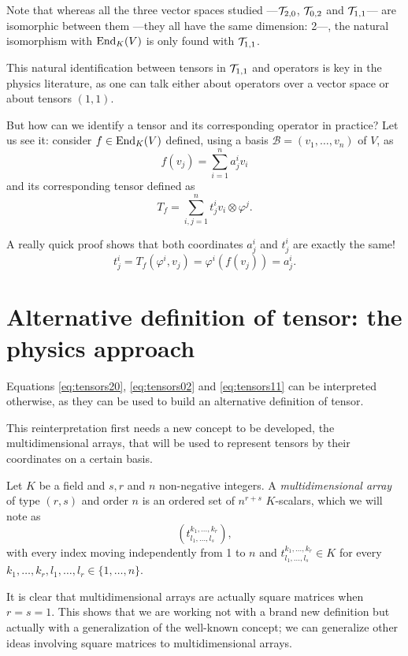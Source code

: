 Note that whereas all the three vector spaces studied ---${\mathcal T}_{2,0}$, ${\mathcal T}_{0,2}$ and ${\mathcal T}_{1,1}$--- are isomorphic between them ---they all have the same dimension: 2---, the natural isomorphism with $\operatorname{End}_K(V)$ is only found with ${\mathcal T}_{1,1}$.

\begin{remark}
	This natural identification between tensors in ${\mathcal T}_{1,1}$ and operators is key in the physics literature, as one can talk either about operators over a vector space or about tensors $(1,1)$.

	But how can we identify a tensor and its corresponding operator in practice? Let us see it: consider $f \in \operatorname{End}_K(V)$ defined, using a basis $\mathcal{B} = (v_1, \dots, v_n)$ of $V$, as
	\[
		f(v_j) = \sum_{i=1}^n a^i_j v_i
	\]
	and its corresponding tensor defined as
	\[
		T_f = \sum_{i,j=1}^n t^i_j v_i \otimes \varphi^j.
	\]

	A really quick proof shows that both coordinates $a^i_j$ and $t^i_j$ are exactly the same!
	\[
		t^i_j = T_f(\varphi^i, v_j) = \varphi^i(f(v_j)) = a^i_j.
	\]
\end{remark}

\section{Alternative definition of tensor: the physics approach}

Equations \ref{eq:tensors20}, \ref{eq:tensors02} and \ref{eq:tensors11} can be interpreted otherwise, as they can be used to build an alternative definition of tensor.

This reinterpretation first needs a new concept to be developed, the multidimensional arrays, that will be used to represent tensors by their coordinates on a certain basis.

\begin{definition}
	Let $K$ be a field and $s, r$ and $n$ non-negative integers. A \emph{multidimensional array} of type $(r,s)$ and order $n$ is an ordered set of $n^{r+s}$ $K$-scalars, which we will note as
	\[
	\left( t^{k_1, \dots, k_r}_{l_1, \dots, l_s} \right),
	\]
	with every index moving independently from 1 to $n$ and $t^{k_1, \dots, k_r}_{l_1, \dots, l_s} \in K$ for every $k_1, \dots, k_r, l_1, \dots, l_r \in \{1, \dots, n\}$.
\end{definition}

It is clear that multidimensional arrays are actually square matrices when $r = s = 1$. This shows that we are working not with a brand new definition but actually with a generalization of the well-known concept; we can generalize other ideas involving square matrices to multidimensional arrays.

